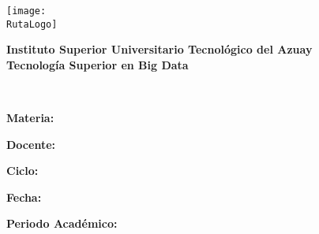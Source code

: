 \begin{titlepage}

    \centering

    \texttt{[image: \\RutaLogo]} 

    \vspace{0.3cm}
    \textcolor{azul}{\Large \textbf{Instituto Superior Universitario Tecnológico del Azuay \\}}
    \vspace{0.3cm}
    \textcolor{azul}{\Large \textbf{Tecnología Superior en Big Data}}
    
    
    {\Large\textbf{\Tema}}
    
    \textcolor{azul}{\large \textbf{\EtiquetaAutores} \\}
    \vspace{0.3cm}
    {\large \Alumno}

    \textcolor{azul}{\large \textbf{Materia:} \\}
    \vspace{0.3cm}
    {\large \Materia}


    \textcolor{azul}{\large \textbf{Docente:} \\}
    \vspace{0.3cm}
    {\large \Docente}


    \textcolor{azul}{\large \textbf{Ciclo:} \\}
    \vspace{0.3cm}
    {\large \Ciclo}


    \textcolor{azul}{\large \textbf{Fecha:} \\}
    \vspace{0.3cm}
    {\large \Fecha}

    \textcolor{azul}{\large \textbf{Periodo Académico:} \\}
    \vspace{0.3cm}
    {\large \Periodo}
 
\end{titlepage}
